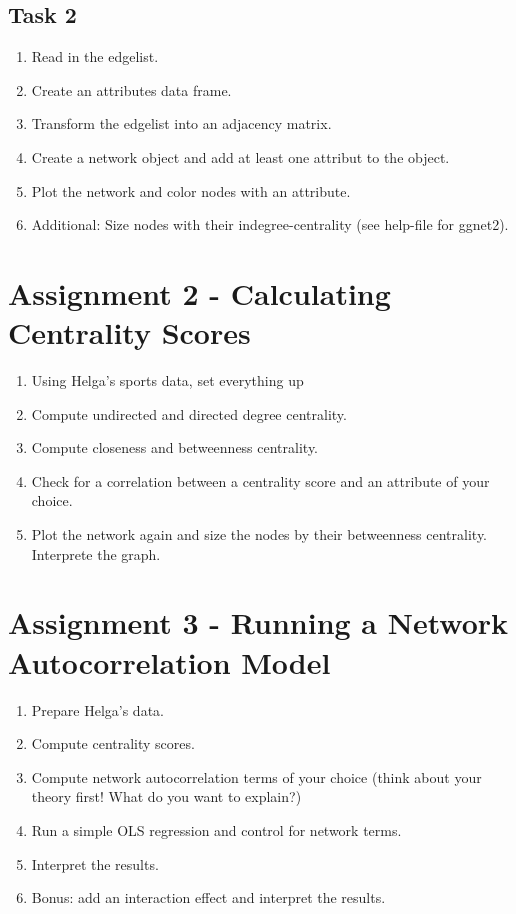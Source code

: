 \documentclass[12pt,a4paper]{article} %
\begin{document}
\subsection{Task 2}

\begin{enumerate}
	\item Read in the edgelist.
	\item Create an attributes data frame. 
	\item Transform the edgelist into an adjacency matrix.
	\item Create a network object and add at least one attribut to the object.
	\item Plot the network and color nodes with an attribute.
	\item Additional: Size nodes with their indegree-centrality (see help-file for ggnet2).
\end{enumerate}

% 
\clearpage
\newpage
\section{Assignment 2 - Calculating Centrality Scores}

\begin{enumerate}
	\item Using Helga's sports data, set everything up
	\item Compute undirected and directed degree centrality.
	\item Compute closeness and betweenness centrality.
	\item Check for a correlation between a centrality score and an attribute of your choice.
	\item Plot the network again and size the nodes by their betweenness centrality. Interprete the graph.
\end{enumerate}

%
\section{Assignment 3 - Running a Network Autocorrelation Model}

\begin{enumerate}
	\item Prepare Helga's data.
	\item Compute centrality scores.
	\item Compute network autocorrelation terms of your choice (think about your theory first! What do you want to explain?)
	\item Run a simple OLS regression and control for network terms. 
	\item Interpret the results.
	\item Bonus: add an interaction effect and interpret the results.
\end{enumerate}











	
\end{document}
